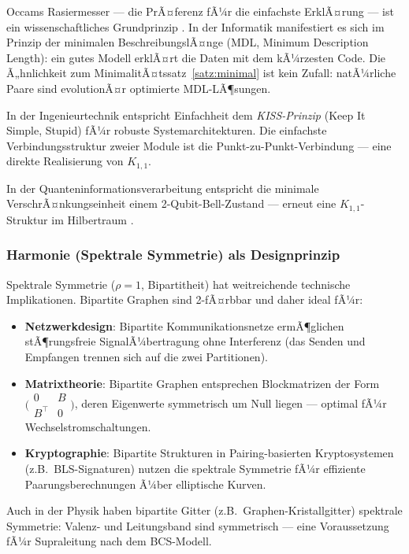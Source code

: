 ﻿\documentclass[a4paper,12pt]{article}
\theoremstyle{definition}
\begin{document}
Occams Rasiermesser --- die PrÃ¤ferenz fÃ¼r die einfachste ErklÃ¤rung --- ist ein
wissenschaftliches Grundprinzip \cite{kolmogorov1965}. In der Informatik manifestiert
es sich im Prinzip der minimalen BeschreibungslÃ¤nge (MDL, Minimum Description Length):
ein gutes Modell erklÃ¤rt die Daten mit dem kÃ¼rzesten Code.
Die Ã„hnlichkeit zum MinimalitÃ¤tssatz~\ref{satz:minimal} ist kein Zufall: natÃ¼rliche
Paare sind evolutionÃ¤r optimierte MDL-LÃ¶sungen.

In der Ingenieurtechnik entspricht Einfachheit dem \emph{KISS-Prinzip}
(Keep It Simple, Stupid) fÃ¼r robuste Systemarchitekturen.
Die einfachste Verbindungsstruktur zweier Module ist die Punkt-zu-Punkt-Verbindung
--- eine direkte Realisierung von $K_{1,1}$.

In der Quanteninformationsverarbeitung entspricht die minimale VerschrÃ¤nkungseinheit
einem 2-Qubit-Bell-Zustand --- erneut eine $K_{1,1}$-Struktur im Hilbertraum
\cite{dirac1930}.

\subsubsection*{Harmonie (Spektrale Symmetrie) als Designprinzip}

Spektrale Symmetrie ($\rho = 1$, Bipartitheit) hat weitreichende technische
Implikationen. Bipartite Graphen sind 2-fÃ¤rbbar und daher ideal fÃ¼r:
\begin{itemize}
	\item \textbf{Netzwerkdesign}: Bipartite Kommunikationsnetze ermÃ¶glichen
	stÃ¶rungsfreie SignalÃ¼bertragung ohne Interferenz (das Senden und Empfangen
	trennen sich auf die zwei Partitionen).
	\item \textbf{Matrixtheorie}: Bipartite Graphen entsprechen Blockmatrizen der Form
	$\bigl(\begin{smallmatrix}0 & B \\ B^\top & 0\end{smallmatrix}\bigr)$,
	deren Eigenwerte symmetrisch um Null liegen --- optimal fÃ¼r
	Wechselstromschaltungen.
	\item \textbf{Kryptographie}: Bipartite Strukturen in Pairing-basierten
	Kryptosystemen (z.B.\ BLS-Signaturen) nutzen die spektrale Symmetrie fÃ¼r
	effiziente Paarungsberechnungen Ã¼ber elliptische Kurven.
\end{itemize}

Auch in der Physik haben bipartite Gitter (z.B.\ Graphen-Kristallgitter) spektrale
Symmetrie: Valenz- und Leitungsband sind symmetrisch --- eine Voraussetzung fÃ¼r
Supraleitung nach dem BCS-Modell.
\end{document}
